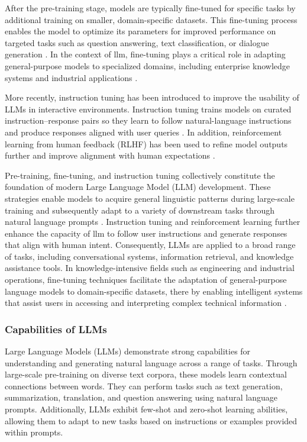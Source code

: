 After the pre-training stage, models are typically fine-tuned for specific tasks by additional training on smaller, domain-specific datasets. This fine-tuning process enables the model to optimize its parameters for improved performance on targeted tasks such as question answering, text classification, or dialogue generation \cite{brown2020languagemodelsfewshotlearners}. In the context of \gls{llm}, fine-tuning \cite{kelly2023gpt35finetuning} plays a critical role in adapting general-purpose models to specialized domains, including enterprise knowledge systems and industrial applications \cite{llmfinetuning2024}.

More recently, instruction tuning has been introduced to improve the usability of LLMs in interactive environments. Instruction tuning trains models on curated instruction–response pairs so they learn to follow natural-language instructions and produce responses aligned with user queries \cite{ouyang2022traininglanguagemodelsfollow}. In addition, reinforcement learning from human feedback (RLHF) has been used to refine model outputs further and improve alignment with human expectations \cite{ouyang2022traininglanguagemodelsfollow}.

Pre-training, fine-tuning, and instruction tuning collectively constitute the foundation of modern Large Language Model (LLM) development. These strategies enable models to acquire general linguistic patterns during large-scale training and subsequently adapt to a variety of downstream tasks through natural language prompts \cite{brown2020languagemodelsfewshotlearners}. Instruction tuning and reinforcement learning further enhance the capacity of \gls{llm} to follow user instructions and generate responses that align with human intent\cite{ouyang2022traininglanguagemodelsfollow}. Consequently, LLMs are applied to a broad range of tasks, including conversational systems, information retrieval, and knowledge assistance tools\cite{brown2020languagemodelsfewshotlearners}. In knowledge-intensive fields such as engineering and industrial operations, fine-tuning techniques facilitate the adaptation of general-purpose language models to domain-specific datasets, there by enabling intelligent systems that assist users in accessing and interpreting complex technical information \cite{llmfinetuning2024}.

\subsubsection{Capabilities of LLMs\label{Capabilities of LLMs}}
Large Language Models (LLMs) demonstrate strong capabilities for understanding and generating natural language across a range of tasks\cite{chowdhery2022palmscalinglanguagemodeling}. Through large-scale pre-training on diverse text corpora, these models learn contextual connections between words\cite{Guo_2021}. They can perform tasks such as text generation, summarization, translation, and question answering using natural language prompts\cite{brown2020languagemodelsfewshotlearners}. Additionally, LLMs exhibit few-shot and zero-shot learning abilities, allowing them to adapt to new tasks based on instructions or examples provided within prompts\cite{brown2020languagemodelsfewshotlearners}.

